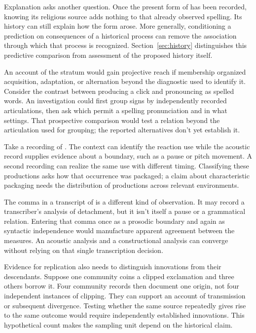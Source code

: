 Explanation asks another question. Once the present form of 
has been recorded, knowing its religious source adds nothing to that
already observed spelling. Its history can still explain how the form
arose. More generally, conditioning a prediction on consequences of a
historical process can remove the association through which that process
is recognized. Section~\ref{sec:history} distinguishes this predictive
comparison from assessment of the proposed history itself.

An account of the stratum would gain projective reach if membership
organized acquisition, adaptation, or alternation beyond the diagnostic
used to identify it. Consider the contrast between producing a click
and pronouncing  as spelled words. An investigation
could first group signs by independently recorded articulations, then
ask which permit a spelling pronunciation and in what settings.
That prospective comparison would test a relation beyond the articulation
used for grouping; the reported alternatives don't yet establish it.

Take a recording of . The
context can identify the reaction use while the acoustic record supplies
evidence about a boundary, such as a pause or pitch movement. A
second recording can realize the same use with different timing.
Classifying these productions asks how that occurrence was packaged;
a claim about characteristic packaging needs the distribution of
productions across relevant environments.

The comma in a transcript of 
is a different kind of observation. It may record a transcriber's
analysis of detachment, but it isn't itself a pause or a grammatical
relation. Entering that comma once as a prosodic boundary and again
as syntactic independence would manufacture apparent agreement between
the measures. An acoustic analysis and a constructional analysis can
converge without relying on that single transcription decision.

Evidence for replication also needs to distinguish innovations from their
descendants. Suppose one community coins a clipped exclamation and
three others borrow it. Four community records then document one
origin, not four independent instances of clipping. They can support
an account of transmission or subsequent divergence. Testing whether
the same source repeatedly gives rise to the same outcome would
require independently established innovations. This hypothetical count
makes the sampling unit depend on the historical claim.

